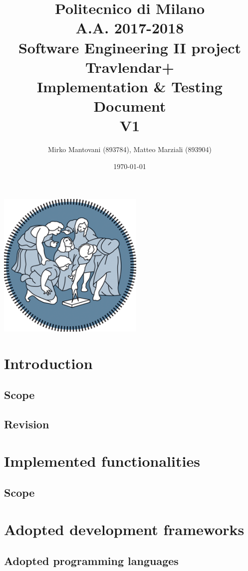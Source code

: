 \documentclass{article}
\author{Mirko Mantovani (893784), Matteo Marziali (893904)}
\date{\today}
\title{Politecnico di Milano
	\\A.A. 2017\@-\@2018
	\\Software Engineering II project \\ \textbf{Travlendar+}
	\\
	\textbf{I}mplementation \& \textbf{T}esting 
	\\ \textbf{D}ocument 
	\\
	\textbf{V1}}
\begin{document}
\maketitle
\begin{center}
	\includegraphics[width=7cm]{polimi-logo}
\end{center}
\clearpage
{\hypersetup{hidelinks}\tableofcontents}

\clearpage

\section{Introduction}
\subsection{Scope}

\subsection{Revision}


\clearpage
\section{Implemented functionalities}
\subsection{Scope}


\clearpage
\section{Adopted development frameworks}
\subsection{Adopted programming languages}
\end{document}
